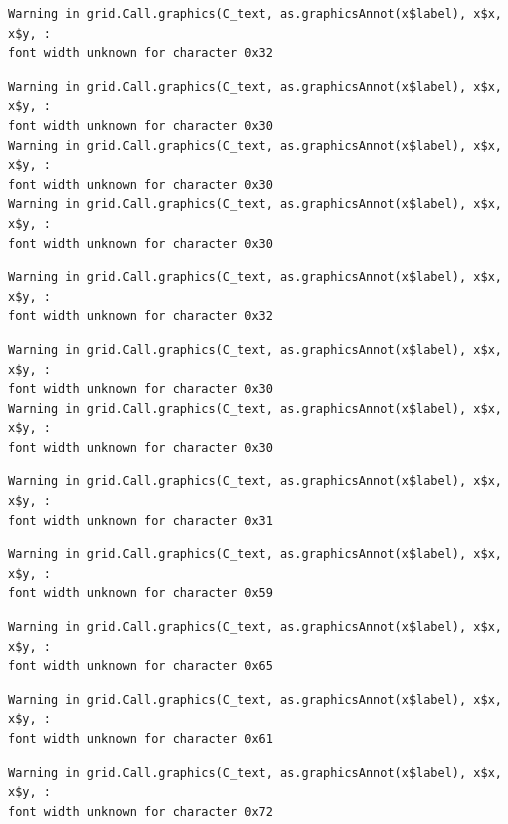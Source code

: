 \documentclass[
  letterpaper,
]{scrbook}
\begin{document}
\begin{verbatim}
Warning in grid.Call.graphics(C_text, as.graphicsAnnot(x$label), x$x, x$y, :
font width unknown for character 0x32
\end{verbatim}

\begin{verbatim}
Warning in grid.Call.graphics(C_text, as.graphicsAnnot(x$label), x$x, x$y, :
font width unknown for character 0x30
Warning in grid.Call.graphics(C_text, as.graphicsAnnot(x$label), x$x, x$y, :
font width unknown for character 0x30
Warning in grid.Call.graphics(C_text, as.graphicsAnnot(x$label), x$x, x$y, :
font width unknown for character 0x30
\end{verbatim}

\begin{verbatim}
Warning in grid.Call.graphics(C_text, as.graphicsAnnot(x$label), x$x, x$y, :
font width unknown for character 0x32
\end{verbatim}

\begin{verbatim}
Warning in grid.Call.graphics(C_text, as.graphicsAnnot(x$label), x$x, x$y, :
font width unknown for character 0x30
Warning in grid.Call.graphics(C_text, as.graphicsAnnot(x$label), x$x, x$y, :
font width unknown for character 0x30
\end{verbatim}

\begin{verbatim}
Warning in grid.Call.graphics(C_text, as.graphicsAnnot(x$label), x$x, x$y, :
font width unknown for character 0x31
\end{verbatim}

\begin{verbatim}
Warning in grid.Call.graphics(C_text, as.graphicsAnnot(x$label), x$x, x$y, :
font width unknown for character 0x59
\end{verbatim}

\begin{verbatim}
Warning in grid.Call.graphics(C_text, as.graphicsAnnot(x$label), x$x, x$y, :
font width unknown for character 0x65
\end{verbatim}

\begin{verbatim}
Warning in grid.Call.graphics(C_text, as.graphicsAnnot(x$label), x$x, x$y, :
font width unknown for character 0x61
\end{verbatim}

\begin{verbatim}
Warning in grid.Call.graphics(C_text, as.graphicsAnnot(x$label), x$x, x$y, :
font width unknown for character 0x72
\end{verbatim}
\end{document}
